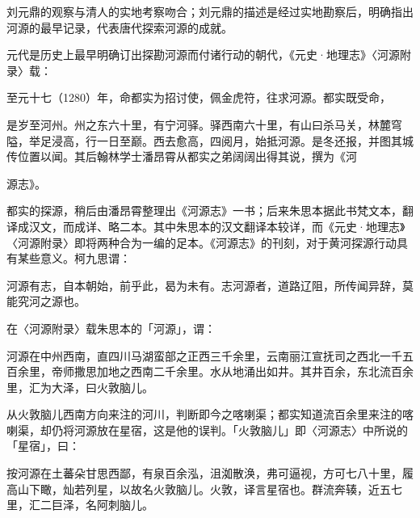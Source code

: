 刘元鼎的观察与清人的实地考察吻合；刘元鼎的描述是经过实地勘察后，明确指出河源的最早记录，代表唐代探索河源的成就。

元代是历史上最早明确订出探勘河源而付诸行动的朝代，《元史·地理志》〈河源附录〉载：

至元十七（1280）年，命都实为招讨使，佩金虎符，往求河源。都实既受命，

\vfill
\begin{BookNotes}
\end{BookNotes}


\begin{BookQuote}
是岁至河州。州之东六十里，有宁河驿。驿西南六十里，有山曰杀马关，林麓穹隘，举足浸高，行一日至巅。西去愈高，四阅月，始抵河源。是冬还报，并图其城传位置以闻。其后翰林学士潘昂霄从都实之弟阔阔出得其说，撰为《河
\end{BookQuote}

源志》。

都实的探源，稍后由潘昂霄整理出《河源志》一书；后来朱思本据此书梵文本，翻译成汉文，而成详、略二本。其中朱思本的汉文翻译本较详，而《元史·地理志》〈河源附录〉即将两种合为一编的足本。《河源志》的刊刻，对于黄河探源行动具有某些意义。柯九思谓：

\begin{BookQuote}
河源有志，自本朝始，前乎此，曷为未有。志河源者，道路辽阻，所传闻异辞，莫能究河之源也。
\end{BookQuote}

在〈河源附录〉载朱思本的「河源」，谓：

\begin{BookQuote}
河源在中州西南，直四川马湖蛮部之正西三千余里，云南丽江宣抚司之西北一千五百余里，帝师撒思加地之西南二千余里。水从地涌出如井。其井百余，东北流百余里，汇为大泽，曰火敦脑儿。
\end{BookQuote}

从火敦脑儿西南方向来注的河川，判断即今之喀喇渠；都实知道流百余里来注的喀喇渠，却仍将河源放在星宿，这是他的误判。「火敦脑儿」即〈河源志〉中所说的「星宿」，曰：

\begin{BookQuote}
按河源在土蕃朵甘思西鄙，有泉百余泓，沮洳散涣，弗可逼视，方可七八十里，履高山下瞰，灿若列星，以故名火敦脑儿。火敦，译言星宿也。群流奔辏，近五七里，汇二巨泽，名阿刺脑儿。
\end{BookQuote}

